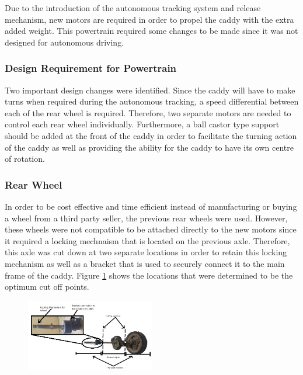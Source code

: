 \documentclass[11pt,landscape]{article}
\begin{document}
\begin{multicols}{2}
    Due to the introduction of the autonomous tracking system and release
    mechanism, new motors are required in order to propel the caddy with the
    extra added weight. This powertrain required some changes to be made since
    it was not designed for autonomous driving.
    
    \subsubsection{Design Requirement for Powertrain}
    Two important design changes were identified. Since the caddy will have to
    make turns when required during the autonomous tracking, a speed
    differential between each of the rear wheel is required. Therefore, two
    separate motors are needed to control each rear wheel individually.
    Furthermore, a ball castor type support should be added at the front of the
    caddy in order to facilitate the turning action of the caddy as well as
    providing the ability for the caddy to have its own centre of rotation. 
    
    
    
    \subsubsection{Rear Wheel}
    In order to be cost effective and time efficient instead of manufacturing or
    buying a wheel from a third party seller, the previous rear wheels were
    used. However, these wheels were not compatible to be attached directly to
    the new motors since it required a locking mechnaism that is located on the
    previous axle. Therefore, this axle was cut down at two separate locations
    in order to retain this locking mechanism as well as a bracket that is used
    to securely connect it to the main frame of the caddy. Figure \ref{fig:rear}
    shows the locations that were determined to be the optimum cut off points.
    
    \begin{figure}[H]
        \begin{center}
            \includegraphics[width=0.5\textwidth]{Figure26.jpg}
            \label{fig:rear}
        \end{center}
    \end{figure}
    

\end{multicols}
\end{document}
